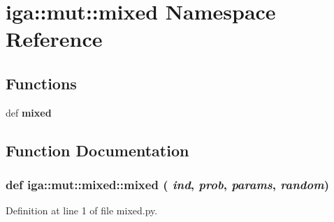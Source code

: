 \section{iga::mut::mixed Namespace Reference}
\label{namespaceiga_1_1mut_1_1mixed}


\subsection*{Functions}
\begin{CompactItemize}
\item 
def {\bf mixed}
\end{CompactItemize}


\subsection{Function Documentation}
\subsubsection{\setlength{\rightskip}{0pt plus 5cm}def iga::mut::mixed::mixed ( {\em ind},  {\em prob},  {\em params},  {\em random})}\label{namespaceiga_1_1mut_1_1mixed_fc8a5551fbb1090cdc50e61299fc341d}




Definition at line 1 of file mixed.py.